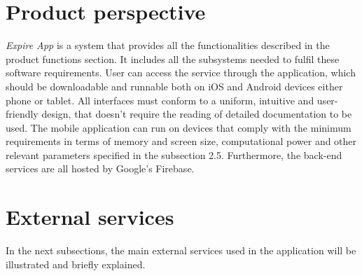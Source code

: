 \section{Product perspective}

\textit{Expire App} is a system that provides all the functionalities described in the product functions section. It includes all the subsystems needed to fulfil these software requirements. User can access the service through the application, which should be downloadable and runnable both on iOS and Android devices either phone or tablet. All interfaces must conform to a uniform, intuitive and user-friendly design, that doesn't require the reading of detailed documentation to be used. The mobile application can run on devices that comply with the minimum requirements in terms of memory and screen size, computational power and other relevant parameters specified in the subsection 2.5. Furthermore, the back-end services are all hosted by Google’s Firebase.

\newpage

\section{External services}
In the next subsections, the main external services used in the application will be illustrated and briefly explained.

